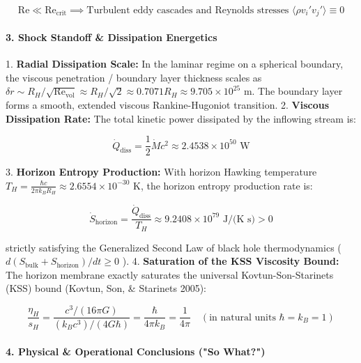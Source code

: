 \documentclass[11pt,a4paper]{article}
\theoremstyle{definition}\newtheorem{definition}{Definition}
\theoremstyle{remark}\newtheorem{remark}{Remark}
\begin{document}
\begin{equation}
\mathrm{Re} \ll \mathrm{Re}_{\text{crit}} \implies \text{Turbulent eddy cascades and Reynolds stresses } \langle \rho v_i' v_j' \rangle \equiv 0
\end{equation}

\paragraph{3. Shock Standoff \& Dissipation Energetics}

1. \textbf{Radial Dissipation Scale:} In the laminar regime on a spherical boundary, the viscous penetration / boundary layer thickness scales as $\delta r \sim R_H / \sqrt{\mathrm{Re}_{\text{vol}}} \approx R_H / \sqrt{2} \approx 0.7071 R_H \approx 9.705 \times 10^{25}\text{ m}$. The boundary layer forms a smooth, extended viscous Rankine-Hugoniot transition.
2. \textbf{Viscous Dissipation Rate:} The total kinetic power dissipated by the inflowing stream is:


\begin{equation}
\dot{Q}_{\text{diss}} = \frac{1}{2} \dot{M} c^2 \approx 2.4538 \times 10^{50}\text{ W}
\end{equation}


3. \textbf{Horizon Entropy Production:} With horizon Hawking temperature $T_H = \frac{\hbar c}{2\pi k_B R_H} \approx 2.6554 \times 10^{-30}\text{ K}$, the horizon entropy production rate is:


\begin{equation}
\dot{S}_{\text{horizon}} = \frac{\dot{Q}_{\text{diss}}}{T_H} \approx 9.2408 \times 10^{79}\text{ J/(K s)} > 0
\end{equation}


strictly satisfying the Generalized Second Law of black hole thermodynamics ( $d(S_{\text{bulk}} + S_{\text{horizon}})/dt \ge 0$ ).
4. \textbf{Saturation of the KSS Viscosity Bound:} The horizon membrane exactly saturates the universal Kovtun-Son-Starinets (KSS) bound (Kovtun, Son, \& Starinets 2005):


\begin{equation}
\frac{\eta_H}{s_H} = \frac{c^3 / (16\pi G)}{(k_B c^3) / (4 G \hbar)} = \frac{\hbar}{4\pi k_B} = \frac{1}{4\pi} \quad (\text{in natural units } \hbar = k_B = 1)
\end{equation}

\paragraph{4. Physical \& Operational Conclusions ("So What?")}
\end{document}

